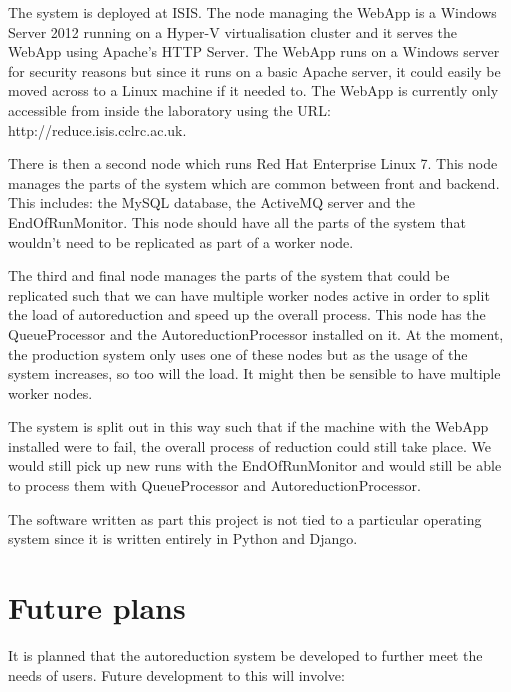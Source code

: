 \documentclass[twocolumn]{article}
\begin{document}
The system is deployed at ISIS. The node managing the WebApp is a Windows Server 2012
running on a Hyper-V\cite{hyper-v} virtualisation cluster and it serves the WebApp using
Apache's HTTP Server\cite{apache}. The WebApp runs on a Windows server for security reasons
but since it runs on a basic Apache server, it could easily be moved across to a Linux machine
if it needed to. The WebApp is currently only accessible from inside the laboratory using the 
URL: http://reduce.isis.cclrc.ac.uk.

There is then a second node which runs Red Hat Enterprise Linux 7\cite{rhel}. This node
manages the parts of the system which are common between front and backend. This includes:
the MySQL database, the ActiveMQ server and the EndOfRunMonitor. This node should have
all the parts of the system that wouldn't need to be replicated as part of a worker node.

The third and final node manages the parts of the system that could be replicated such that 
we can have multiple worker nodes active in order to split the load of autoreduction and speed
up the overall process. This node has the QueueProcessor and the AutoreductionProcessor installed
on it. At the moment, the production system only uses one of these nodes but as the usage of the 
system increases, so too will the load. It might then be sensible to have multiple worker nodes.

The system is split out in this way such that if the machine with the WebApp installed were to fail,
the overall process of reduction could still take place. We would still pick up new runs with the 
EndOfRunMonitor and would still be able to process them with QueueProcessor and AutoreductionProcessor.

The software written as part this project is not tied to a
particular operating system since it is written entirely in Python and Django. 

\section{Future plans}\label{future-plans}

It is planned that the autoreduction system be developed to further meet
the needs of users. Future development to this will involve:
\end{document}
